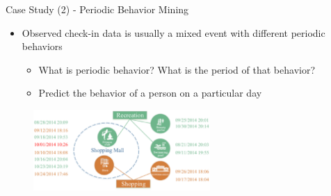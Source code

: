 \documentclass[
 size=14pt,
 paper=smartboard,  %
 mode=present, 		%
 display=slides, 	%
 style=tuliplab,  	%
 pauseslide,
 fleqn,leqno]{powerdot}{}
\begin{document}
\begin{slide}[toc=,bm=]{Case Study (2) - Periodic Behavior Mining}

\begin{itemize}
\item
Observed check-in data is usually a mixed event with different periodic behaviors

\begin{itemize}
\item
What is periodic behavior?
What is the period of that behavior?

\item
Predict the behavior of a person on a particular day
\end{itemize}
\end{itemize}

\begin{figure}[htbp]
    \centering
    \includegraphics[width=0.6\textwidth]{figures//theme1//Theme1_18.eps}
\end{figure}

%
\footnotesize{}

\end{slide}
\end{document}
